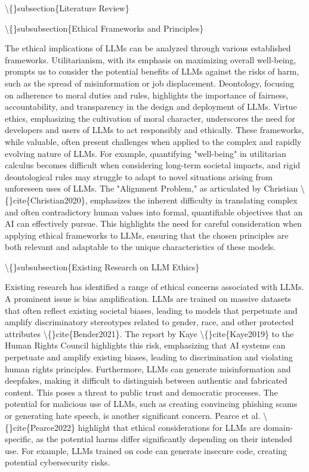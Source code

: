 \documentclass{article}
\begin{document}
\textbackslash\{\}subsection\{Literature Review\}

\textbackslash\{\}subsubsection\{Ethical Frameworks and Principles\}

The ethical implications of LLMs can be analyzed through various established frameworks. Utilitarianism, with its emphasis on maximizing overall well-being, prompts us to consider the potential benefits of LLMs against the risks of harm, such as the spread of misinformation or job displacement. Deontology, focusing on adherence to moral duties and rules, highlights the importance of fairness, accountability, and transparency in the design and deployment of LLMs. Virtue ethics, emphasizing the cultivation of moral character, underscores the need for developers and users of LLMs to act responsibly and ethically. These frameworks, while valuable, often present challenges when applied to the complex and rapidly evolving nature of LLMs. For example, quantifying "well-being" in utilitarian calculus becomes difficult when considering long-term societal impacts, and rigid deontological rules may struggle to adapt to novel situations arising from unforeseen uses of LLMs.  The "Alignment Problem," as articulated by Christian \textbackslash\{\}cite\{Christian2020\}, emphasizes the inherent difficulty in translating complex and often contradictory human values into formal, quantifiable objectives that an AI can effectively pursue. This highlights the need for careful consideration when applying ethical frameworks to LLMs, ensuring that the chosen principles are both relevant and adaptable to the unique characteristics of these models.

\textbackslash\{\}subsubsection\{Existing Research on LLM Ethics\}

Existing research has identified a range of ethical concerns associated with LLMs. A prominent issue is bias amplification. LLMs are trained on massive datasets that often reflect existing societal biases, leading to models that perpetuate and amplify discriminatory stereotypes related to gender, race, and other protected attributes \textbackslash\{\}cite\{Bender2021\}.  The report by Kaye \textbackslash\{\}cite\{Kaye2019\} to the Human Rights Council highlights this risk, emphasizing that AI systems can perpetuate and amplify existing biases, leading to discrimination and violating human rights principles. Furthermore, LLMs can generate misinformation and deepfakes, making it difficult to distinguish between authentic and fabricated content. This poses a threat to public trust and democratic processes. The potential for malicious use of LLMs, such as creating convincing phishing scams or generating hate speech, is another significant concern.  Pearce et al. \textbackslash\{\}cite\{Pearce2022\} highlight that ethical considerations for LLMs are domain-specific, as the potential harms differ significantly depending on their intended use.  For example, LLMs trained on code can generate insecure code, creating potential cybersecurity risks.
\end{document}
